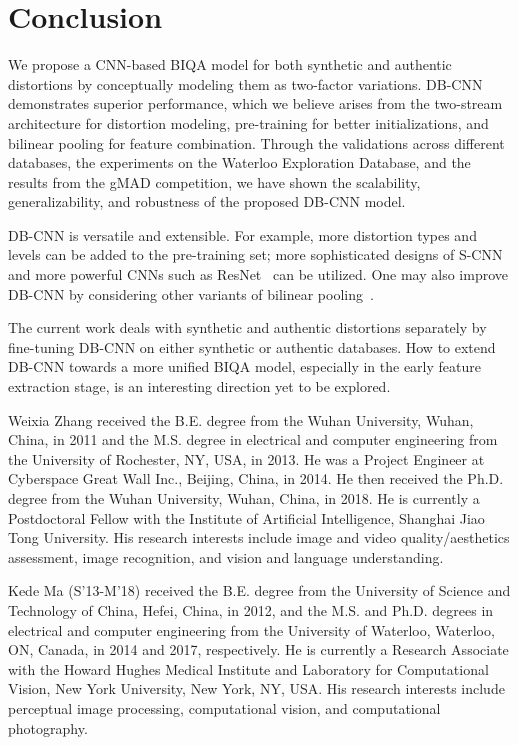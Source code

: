 \documentclass[journal]{IEEEtran}
\begin{document}
\section{Conclusion}\label{sec:conclution}
We propose a CNN-based BIQA model for both synthetic and authentic distortions by conceptually modeling them as two-factor variations. DB-CNN demonstrates superior performance, which we believe arises from the two-stream architecture for distortion modeling, pre-training for better initializations, and bilinear pooling for feature combination. Through the validations across different databases, the experiments on the Waterloo Exploration Database, and the results from the gMAD competition, we have shown the scalability, generalizability, and robustness of the proposed DB-CNN model.

DB-CNN is versatile and  extensible. For example, more distortion types and levels can be added to the pre-training set; more sophisticated designs of S-CNN and more powerful CNNs such as ResNet~\cite{he2016deep} can be utilized. One may also improve DB-CNN by considering other variants of bilinear pooling~\cite{gao2016compact}.


The current work deals with synthetic and authentic distortions separately by fine-tuning DB-CNN on either synthetic or authentic databases. How to extend DB-CNN towards a more unified BIQA model, especially in the early feature extraction stage, is an interesting direction yet to be explored.






\begin{IEEEbiography}{Weixia Zhang}
received the B.E. degree from the Wuhan University, Wuhan, China, in 2011 and the M.S. degree in electrical and computer engineering from the University of Rochester, NY, USA, in 2013. He was a Project Engineer at Cyberspace Great Wall Inc., Beijing, China, in 2014. He then received the Ph.D. degree from the Wuhan University, Wuhan, China, in 2018. He is currently a Postdoctoral Fellow with the Institute of Artificial Intelligence, Shanghai Jiao Tong University. His research interests include image and video quality/aesthetics assessment, image recognition, and vision and language understanding.
\end{IEEEbiography}

\begin{IEEEbiography}{Kede Ma}
(S'13-M'18) received the B.E. degree from the University of Science and Technology of China, Hefei, China, in 2012, and the M.S. and Ph.D. degrees in electrical and computer engineering from the University of Waterloo, Waterloo, ON, Canada, in 2014 and 2017, respectively. He is currently a Research Associate with the Howard Hughes Medical Institute and Laboratory for Computational Vision, New York University, New York, NY, USA. His research interests include perceptual image processing, computational vision, and computational photography.
\end{IEEEbiography}
\end{document}

